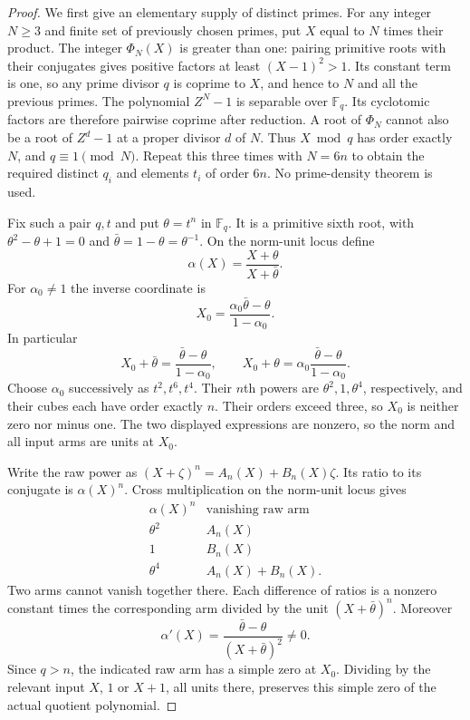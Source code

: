 \begin{proof}
We first give an elementary supply of distinct primes. For any integer
$N\ge3$ and finite set of previously chosen primes, put $X$ equal to
$N$ times their product. The integer $\Phi_N(X)$ is greater than one:
pairing primitive roots with their conjugates gives positive factors
at least $(X-1)^2>1$. Its constant term is one, so any prime divisor
$q$ is coprime to $X$, and hence to $N$ and all the previous primes.
The polynomial $Z^N-1$ is separable over $\mathbb F_q$. Its cyclotomic
factors are therefore pairwise coprime after reduction. A root of
$\Phi_N$ cannot also be a root of $Z^d-1$ at a proper divisor $d$ of
$N$. Thus $X\bmod q$ has order exactly $N$, and $q\equiv1\pmod N$.
Repeat this three times with $N=6n$ to obtain the required distinct
$q_i$ and elements $t_i$ of order $6n$. No prime-density theorem is used.

Fix such a pair $q,t$ and put $\theta=t^n$ in $\mathbb F_q$. It is
a primitive sixth root, with $\theta^2-\theta+1=0$ and
$\bar\theta=1-\theta=\theta^{-1}$. On the norm-unit locus define
\[
 \alpha(X)=\frac{X+\theta}{X+\bar\theta}.
\]
For $\alpha_0\ne1$ the inverse coordinate is
\begin{equation}\label{td-inverse}
 X_0=\frac{\alpha_0\bar\theta-\theta}{1-\alpha_0}.
\end{equation}
In particular
\[
 X_0+\bar\theta=\frac{\bar\theta-\theta}{1-\alpha_0},
 \qquad X_0+\theta=
   \alpha_0\frac{\bar\theta-\theta}{1-\alpha_0}.
\]
Choose $\alpha_0$ successively as $t^2,t^6,t^4$. Their $n$th powers
are $\theta^2,1,\theta^4$, respectively, and their cubes each have
order exactly $n$. Their orders exceed three, so $X_0$ is neither
zero nor minus one. The two displayed expressions are nonzero,
so the norm and all input arms are units at $X_0$.

Write the raw power as
$(X+\zeta)^n=A_n(X)+B_n(X)\zeta$. Its ratio to its conjugate is
$\alpha(X)^n$. Cross multiplication on the norm-unit locus gives
\[
 \begin{array}{c|c}
 \alpha(X)^n&\text{vanishing raw arm}\\ \hline
 \theta^2&A_n(X)\\
 1&B_n(X)\\
 \theta^4&A_n(X)+B_n(X).
 \end{array}
\]
Two arms cannot vanish together there. Each difference of ratios is
a nonzero constant times the corresponding arm divided by the unit
$(X+\bar\theta)^n$. Moreover
\[
 \alpha'(X)=\frac{\bar\theta-\theta}{(X+\bar\theta)^2}\ne0.
\]
Since $q>n$, the indicated raw arm has a simple zero at $X_0$.
Dividing by the relevant input $X$, $1$ or $X+1$, all units there,
preserves this simple zero of the actual quotient polynomial.


\end{proof}
